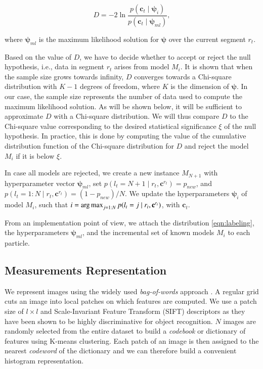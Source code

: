 \begin{equation}
\label{eqn:statistic}
D = -2\ln\frac{p(\mathbf{c}_t\mid \boldsymbol{\psi}_i)}{p(\mathbf{c}_t\mid
\boldsymbol{\psi}_{ml})},
\end{equation}

where $\boldsymbol{\psi}_{ml}$ is the maximum likelihood solution for
$\boldsymbol{\psi}$ over the current segment $r_t$.

Based on the value of $D$, we have to decide whether to accept or reject the
null hypothesis, i.e., data in segment $r_t$ arises from model $M_i$. It is
shown that when the sample size grows towards infinity, $D$ converges towards a
Chi-square distribution with $K-1$ degrees of freedom, where $K$ is the
dimension of $\boldsymbol{\psi}$. In our case, the sample size represents the
number of data used to compute the maximum likelihood solution. As will be
shown below, it will be sufficient to approximate $D$ with a Chi-square
distribution. We will thus compare $D$ to the Chi-square value corresponding to
the desired statistical significance $\xi$ of the null hypothesis. In practice,
this is done by computing the value of the cumulative distribution
function of the Chi-square distribution for $D$ and reject the model
$M_i$ if it is below $\xi$.

In case all models are rejected, we create a new instance $M_{N+1}$
with hyperparameter vector $\boldsymbol{\psi}_{ml}$, set $p(l_t=N+1\mid r_t,
\mathbf{c}^{r_t})=p_{new}$, and $p(l_t=1:N\mid r_t,\mathbf{c}^{r_t})=
(1-p_{new})/N$. We update the hyperparameters $\boldsymbol{\psi}_i$ of model
$M_i$, such that $i=\operatorname*{arg\,max}_{j=1:N}p(l_t=j\mid
r_t,\mathbf{c}^{r_t})$, with $\mathbf{c}_t$.

From an implementation point of view, we attach the distribution
\eqref{eqn:labeling}, the hyperparameters $\boldsymbol{\psi}_{ml}$, and the
incremental set of known models $M_i$ to each particle.

\subsection{Measurements Representation}
We represent images using the widely used \emph{bag-of-words}
approach
. A regular grid cuts an image into local patches on
which features are computed.  We use a patch size of $l\times l$ and
Scale-Invariant Feature Transform (SIFT) \cite{lowe04distinctive}
descriptors as they have been shown to be highly discriminative for
object recognition. $N$ images are randomly selected from the entire
dataset to build a \emph{codebook} or dictionary of features using
K-means clustering. Each patch of an image is then assigned to the
nearest \emph{codeword} of the dictionary and we can therefore build a
convenient histogram representation.

